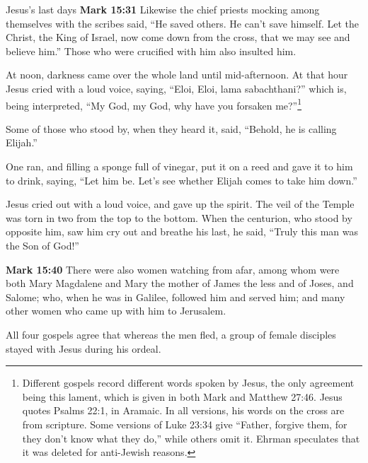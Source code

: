 \documentclass[10pt,a5paper,twoside]{article}
\newcommand{\doimage}[2]{\texttt{[image: \#2]}\label{fig:#2}}
\newcommand{\figbasic}[4]{ %
    \ifthenelse{\isodd{\pageref{fig:#2}}}{}{\hfill}
    \ifstrempty{#3}{
      \doimage{#1}{#2}
    }{
      \makebox{\doimage{#1}{#2} \\ #3}
    }
    \ifthenelse{\isodd{\pageref{fig:#2}}}{\hfill}{}
    \par
}
\newcommand{\fig}[2][0.4]{
  \figbasic{#1}{#2}{}{}
}
\newcommand{\quotesize}{\normalsize{}}
\newcommand{\comm}[1]{\begingroup \color{black!50} #1\endgroup}
\newenvironment{quotetext}{\begingroup\quotesize}{\endgroup}
\newcommand{\intex}[1]{\index[texts]{#1}}
\newcommand{\reftex}[1]{#1\intex{#1}}
\newcommand{\bible}[2]{\begin{quotetext}\textbf{#1}\intex{#1} #2\end{quotetext}}
\newcommand{\gospelmark}[2]{\bible{Mark #1}{#2}}
\begin{document}
\begin{section}{Jesus's last days}
\gospelmark{15:31}{
  Likewise the chief priests mocking among themselves with the scribes said, ``He saved others. He can't save himself.   Let the Christ, the King of Israel, now come down from the cross, that we may see and believe him.'' Those who were crucified with him also insulted him.

  At noon, darkness came over the whole land until mid-afternoon.   At that hour Jesus cried with a loud voice, saying, ``Eloi, Eloi, lama sabachthani?'' which is, being interpreted, ``My God, my God, why have
you forsaken me?''\footnote{Different gospels record different words spoken by Jesus, the only agreement being this lament, which is
given in both Mark and Matthew 27:46. Jesus quotes Psalms 22:1, in Aramaic. In all versions, his words on the cross are from scripture.
Some versions of \reftex{Luke 23:34} give ``Father, forgive them, for they don’t know what they do,'' while others omit it. Ehrman
speculates that it was deleted for anti-Jewish reasons.}


  Some of those who stood by, when they heard it, said, ``Behold, he is calling Elijah.''

  One ran, and filling a sponge full of vinegar, put it on a reed and gave it to him to drink, saying, ``Let him be. Let's see whether Elijah comes to take him down.''

  Jesus cried out with a loud voice, and gave up the spirit.   The veil of the Temple was torn in two from the top to the bottom.   
When the centurion, who stood by opposite him, saw him cry out and breathe his last, he said, ``Truly this man was the Son of God!''}

\fig[0.6]{what-our-lord-saw-from-the-cross-detail}

\gospelmark{15:40}{
  There were also women watching from afar, among whom were both Mary Magdalene and Mary the mother of James the less and of Joses, and Salome;   who, when he was in Galilee, followed him and served him; and many other women who came up with him to Jerusalem.
}

\comm{All four gospels agree that whereas the men fled, a group of female disciples stayed with Jesus during his ordeal.}

\end{section}

\fig{resurrection-mary-magdalene}
\end{document}
